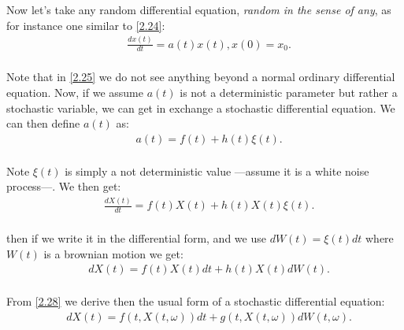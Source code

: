 \documentclass[12pt]{article}
\numberwithin{equation}{section}
\begin{document}
Now let's take any random differential equation, \emph{random in the sense of any}, as for instance one similar to \ref{2.24}: 
\begin{equation} \label{2.25}
    \begin{split}
           &  \frac{dx(t)}{dt} = a(t)x(t), x(0) = x_0. \\
    \end{split}
\end{equation}

Note that in \ref{2.25} we do not see anything beyond a normal ordinary differential equation. Now, if we assume $a(t)$ is not a deterministic parameter but rather a stochastic variable, we can get in exchange a stochastic differential equation. We can then define $a(t)$ as: 
\begin{equation} \label{2.26}
    \begin{split}
           &  a(t) = f(t) + h(t)\xi(t). \\
    \end{split}
\end{equation}

Note $\xi(t)$ is simply a not deterministic value ---assume it is a white noise process---. We then get:
\begin{equation} \label{2.27}
    \begin{split}
           &  \frac{dX(t)}{dt} = f(t)X(t) + h(t)X(t)\xi(t). \\
    \end{split}
\end{equation}

then if we write it in the differential form, and we use $dW(t) = \xi(t)dt$ where $W(t)$ is a brownian motion we get:
\begin{equation} \label{2.28}
    \begin{split}
           & dX(t) = f(t)X(t)dt + h(t)X(t)dW(t). \\
    \end{split}
\end{equation}

From \ref{2.28} we derive then the usual form of a stochastic differential equation: 
\begin{equation} \label{2.29}
    \begin{split}
           & dX(t) = f(t, X(t, \omega))dt + g(t, X(t, \omega))dW(t, \omega). \\
    \end{split}
\end{equation}
\end{document}
